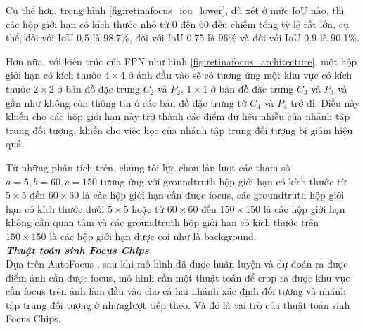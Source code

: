 {    \noindent
    Cụ thể hơn, trong hình \ref{fig:retinafocus_iou_lower}, dù xét ở mức IoU nào, thì các hộp giới hạn có kích thước nhỏ từ 0 đến 60 đều chiếm tổng tỷ lệ rất lớn, cụ thể, đối với IoU 0.5 là 98.7\%, đối với IoU 0.75 là 96\% và đối với IoU 0.9 là 90.1\%.

    \noindent
    Hơn nữa, với kiến trúc của FPN như hình \ref{fig:retinafocus_architecture}, một hộp giới hạn có kích thước $4 \times 4$ ở ảnh đầu vào sẽ có tương ứng một khu vực có kích thước $2 \times 2$ ở bản đồ đặc trưng ${C}_{2}$ và ${P}_{2}$, $1 \times 1$ ở bản đồ đặc trưng ${C}_{3}$ và ${P}_{3}$ và gần như không còn thông tin ở các bản đồ đặc trưng từ ${C}_{4}$ và ${P}_{4}$ trở đi.
    Điều này khiến cho các hộp giới hạn này trở thành các điểm dữ liệu nhiễu của nhánh tập trung đối tượng, khiến cho việc học của nhánh tập trung đối tượng bị giảm hiệu quả.

    \noindent
    Từ những phân tích trên, chúng tôi lựa chọn lần lượt các tham số $a = 5, b = 60, c = 150$ tương ứng với groundtruth hộp giới hạn có kích thước từ $5 \times 5$ đến $60 \times 60$ là các hộp giới hạn cần được focus, các groundtruth hộp giới hạn có kích thước dưới $5 \times 5$ hoặc từ $60 \times 60$ đến $150 \times 150$ là các hộp giới hạn không cần quan tâm và các groundtruth hộp giới hạn có kích thước trên $150 \times 150$ là các hộp giới hạn được coi như là background. \\

    \noindent
    \textbf{\textit{Thuật toán sinh Focus Chips}} \\
    Dựa trên AutoFocus \cite{najibi2019autofocus}, sau khi mô hình đã được huấn luyện và dự đoán ra được điểm ảnh cần được focus, mô hình cần một thuật toán để crop ra được khu vực cần focus trên ảnh làm đầu vào cho cả hai nhánh xác định đối tượng và nhánh tập trung đối tượng ở nhữnglượt tiếp theo.
    Và đó là vai trò của thuật toán sinh Focus Chips.

}
